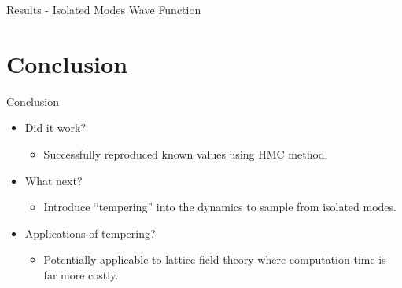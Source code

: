 \documentclass{beamer}
\begin{document}
\begin{frame}{Results - Isolated Modes Wave Function}
\end{frame}

\section{Conclusion}
\begin{frame}{Conclusion}
\begin{itemize}
  \item<2-> Did it work? 
    \begin{itemize}
        \item<3-> Successfully reproduced known values using HMC method.
    \end{itemize}
  \item<4-> What next?
    \begin{itemize}
        \item<5-> Introduce ``tempering'' into the dynamics to sample from isolated modes.
    \end{itemize}
  \item<6-> Applications of tempering?
  \begin{itemize}
        \item<7-> Potentially applicable to lattice field theory where computation time is far more costly.
    \end{itemize}
\end{itemize}
\end{frame}
\end{document}
